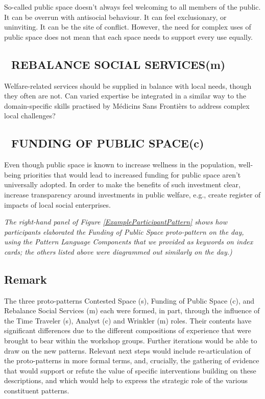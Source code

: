 \documentclass[acmlarge,timestamp]{acmart}
\newcommand{\cognitive}{(c)}
\newcommand{\motor}{(m)}
\begin{document}
So-called public space doesn’t always feel welcoming to all members of the public.  It can be overrun with antisocial behaviour.  It can feel exclusionary, or uninviting.  It can be the site of conflict. However, the need for complex uses of public space does not mean that each space needs to support every use equally.

\subsection*{💎 REBALANCE SOCIAL SERVICES{\hfill \motor}}\label{pat:rebalance-social-services}

Welfare-related services should be supplied in balance with local needs, though they often are not. Can varied expertise be integrated in a similar way to the domain-specific skills practised by Médicins Sans Frontièrs to address complex local challenges?

\subsection*{💎 FUNDING OF PUBLIC SPACE{\hfill \cognitive}}\label{pat:funding-of-public-space}

Even though public space is known to increase wellness in the population, well-being priorities that would lead to increased funding for public space aren’t universally adopted.  In order to make the benefits of such investment clear, increase transparency around investments in public welfare, e.g., create register of impacts of local social enterprises.

\medskip

\noindent \emph{The right-hand panel of Figure
\ref{ExampleParticipantPattern} shows how participants elaborated the
    {\sc Funding of Public Space} proto-pattern on the day, using the
    {\sc Pattern Language Components} that we provided as keywords on
    index cards; the others listed above were diagrammed out similarly
    on the day.)}

\medskip

\subsection{Remark}
The three proto-patterns {\sc Contested Space} (s), {\sc Funding of
  Public Space} (c), and {\sc Rebalance Social Services} (m) each were
formed, in part, through the influence of the {\sc Time Traveler} (s),
{\sc Analyst} (c) and {\sc Wrinkler} (m) roles. Their contents have
significant differences due to the different compositions of
experience that were brought to bear within the workshop groups.
Further iterations would be able to draw on the new patterns.
Relevant next steps would include re-articulation of the
proto-patterns in more formal terms, and, crucially, the gathering of
evidence that would support or refute the value of specific
interventions building on these descriptions, and which would help to
express the strategic role of the various constituent patterns.
\end{document}
